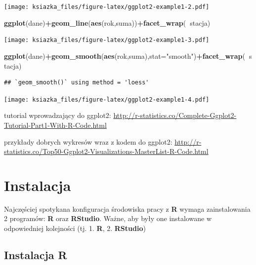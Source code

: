 \documentclass[]{book}
\newenvironment{Shaded}{\begin{snugshade}}{\end{snugshade}}
\newcommand{\KeywordTok}[1]{\textcolor[rgb]{0.13,0.29,0.53}{\textbf{#1}}}
\newcommand{\DataTypeTok}[1]{\textcolor[rgb]{0.13,0.29,0.53}{#1}}
\newcommand{\StringTok}[1]{\textcolor[rgb]{0.31,0.60,0.02}{#1}}
\newcommand{\OperatorTok}[1]{\textcolor[rgb]{0.81,0.36,0.00}{\textbf{#1}}}
\newcommand{\NormalTok}[1]{#1}
\theoremstyle{definition}
\theoremstyle{definition}
\theoremstyle{definition}
\theoremstyle{remark}
\begin{document}
\texttt{[image: ksiazka\_files/figure-latex/ggplot2-example1-2.pdf]}

\begin{Shaded}
\begin{Highlighting}[]
\KeywordTok{ggplot}\NormalTok{(dane)}\OperatorTok{+}\KeywordTok{geom_line}\NormalTok{(}\KeywordTok{aes}\NormalTok{(rok,suma))}\OperatorTok{+}\KeywordTok{facet_wrap}\NormalTok{(}\OperatorTok{~}\NormalTok{stacja)}
\end{Highlighting}
\end{Shaded}

\texttt{[image: ksiazka\_files/figure-latex/ggplot2-example1-3.pdf]}

\begin{Shaded}
\begin{Highlighting}[]
\KeywordTok{ggplot}\NormalTok{(dane)}\OperatorTok{+}\KeywordTok{geom_smooth}\NormalTok{(}\KeywordTok{aes}\NormalTok{(rok,suma),}\DataTypeTok{stat=}\StringTok{"smooth"}\NormalTok{)}\OperatorTok{+}\KeywordTok{facet_wrap}\NormalTok{(}\OperatorTok{~}\NormalTok{stacja)}
\end{Highlighting}
\end{Shaded}

\begin{verbatim}
## `geom_smooth()` using method = 'loess'
\end{verbatim}

\texttt{[image: ksiazka\_files/figure-latex/ggplot2-example1-4.pdf]}

tutorial wprowadzający do ggplot2:
\url{http://r-statistics.co/Complete-Ggplot2-Tutorial-Part1-With-R-Code.html}

przykłady dobrych wykresów wraz z kodem do ggplot2:
\url{http://r-statistics.co/Top50-Ggplot2-Visualizations-MasterList-R-Code.html}

\chapter*{Instalacja}\label{instalacja}

Najczęściej spotykana konfiguracja środowiska pracy z \textbf{R} wymaga
zainstalowania 2 programów: \textbf{R} oraz \textbf{RStudio}. Ważne, aby
były one instalowane w odpowiedniej kolejności (tj. 1. \textbf{R}, 2.
\textbf{RStudio})

\section*{\texorpdfstring{Instalacja
\textbf{R}}{Instalacja R}}\label{instalacja-r}
\end{document}
